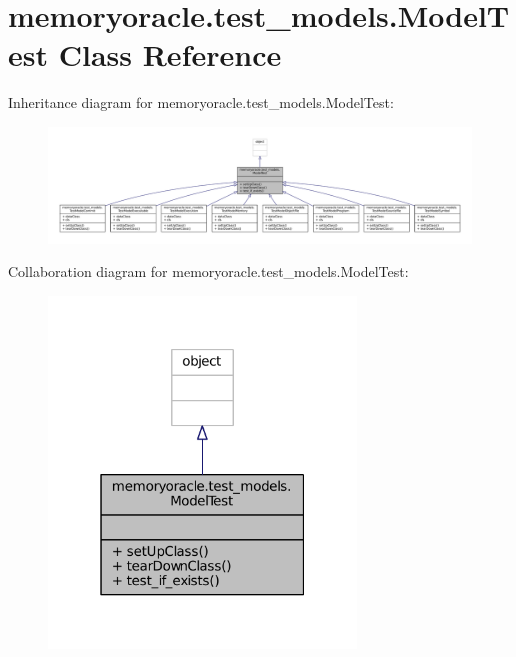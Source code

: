 \hypertarget{classmemoryoracle_1_1test__models_1_1ModelTest}{}\section{memoryoracle.\+test\+\_\+models.\+Model\+Test Class Reference}
\label{classmemoryoracle_1_1test__models_1_1ModelTest}


Inheritance diagram for memoryoracle.\+test\+\_\+models.\+Model\+Test\+:\nopagebreak
\begin{figure}[H]
\begin{center}
\leavevmode
\includegraphics[width=350pt]{classmemoryoracle_1_1test__models_1_1ModelTest__inherit__graph}
\end{center}
\end{figure}


Collaboration diagram for memoryoracle.\+test\+\_\+models.\+Model\+Test\+:\nopagebreak
\begin{figure}[H]
\begin{center}
\leavevmode
\includegraphics[width=232pt]{classmemoryoracle_1_1test__models_1_1ModelTest__coll__graph}
\end{center}
\end{figure}
